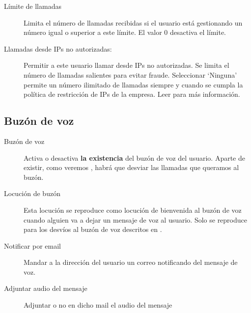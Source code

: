 \documentclass[letterpaper,10pt,spanish]{sphinxmanual}
\begin{document}
\begin{description}
\item[{Límite de llamadas}] \leavevmode{}\label{pbx_features/users:term-max-calls}
Limita el número de llamadas recibidas si el usuario está gestionando un número igual o superior a este límite. El valor 0 desactiva el límite.

\item[{Llamadas desde IPs no autorizadas:}] \leavevmode{}\label{pbx_features/users:term-calls-from-non-granted-ips}
Permitir a este usuario llamar desde IPs no autorizadas. Se limita el número de llamadas salientes para evitar fraude. Seleccionar `Ninguna' permite un número ilimitado de llamadas siempre y cuando se cumpla la política de restricción de IPs de la empresa. Leer {\hyperref[security/index:roadwarrior\string-users]{}} para más información.

\end{description}


\subsection{Buzón de voz}
\label{pbx_features/users:voicemail}
\noindent{}
\begin{description}
\item[{Buzón de voz}] \leavevmode{}\label{pbx_features/users:term-voicemail-enabled}
Activa o desactiva \textbf{la existencia} del buzón de voz del usuario. Aparte de existir, como veremos {\hyperref[pbx_features/users:fwd\string-to\string-vm]{}}, habrá que desviar las llamadas que queramos al buzón.

\item[{Locución de buzón}] \leavevmode{}\label{pbx_features/users:term-voicemail-locution}
Esta locución se reproduce como locución de bienvenida al buzón de voz cuando alguien va a dejar un mensaje de voz al usuario. Solo se reproduce para los desvíos al buzón de voz descritos en {\hyperref[pbx_features/users:fwd\string-to\string-vm]{}}.

\item[{Notificar por email}] \leavevmode{}\label{pbx_features/users:term-email-notification}
Mandar a la dirección del usuario un correo notificando del mensaje de voz.

\item[{Adjuntar audio del mensaje}] \leavevmode{}\label{pbx_features/users:term-attach-sounds}
Adjuntar o no en dicho mail el audio del mensaje

\end{description}
\end{document}

